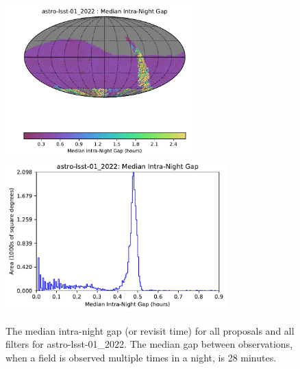 \documentclass[DM,lsstdraft,authoryear,toc]{lsstdoc}
\begin{document}
\begin{figure}[htb]
\centering
\vskip -0.0in
\includegraphics[height=2.3in]{figures/astro-lsst-01_2022_Median_Intra-Night_Gap_HEAL_SkyMap.pdf}
\includegraphics[height=2.3in]{figures/astro-lsst-01_2022-median_intra_night_gap_hist.pdf}
\vskip -0.1in
\caption{The median intra-night gap (or revisit time) for all proposals and all filters for astro-lsst-01\_2022.
The median gap between observations, when a field is observed multiple times in a night, is 28 minutes.
\label{fig:baseline_InterGapAll}}
\end{figure}
\end{document}
